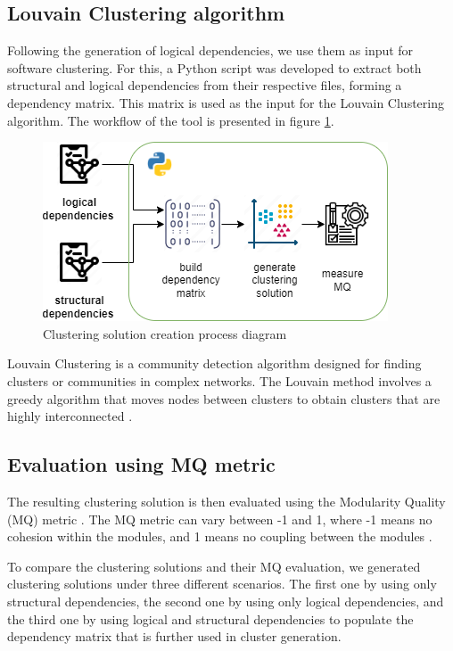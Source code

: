 \documentclass[conference]{IEEEtran}
\begin{document}
\subsection{Louvain Clustering algorithm}

Following the generation of logical dependencies, we use them as input for software clustering. For this, a Python script was developed to extract both structural and logical dependencies from their respective files, forming a dependency matrix. This matrix is used as the input for the Louvain Clustering algorithm. The workflow of the tool is presented in figure \ref{fig:clustering-gen}.

\begin{figure}[H]
\centering
\includegraphics[width=\columnwidth]{clustering-generation.png}
\caption{Clustering solution creation process diagram}
\label{fig:clustering-gen}
\end{figure}

Louvain Clustering is a community detection algorithm designed for finding clusters or communities in complex networks. The Louvain method involves a greedy algorithm that moves nodes between clusters to obtain clusters that are highly interconnected \cite{louvain_clustering}.

\subsection{Evaluation using MQ metric}
The resulting clustering solution is then evaluated using the Modularity Quality (MQ) metric . The MQ metric can vary between -1 and 1, where -1 means no cohesion within the modules, and 1 means no coupling between the modules \cite{mqmetric}.

To compare the clustering solutions and their MQ evaluation, we generated clustering solutions under three different scenarios. The first one by using only structural dependencies, the second one by using only logical dependencies, and the third one by using logical and structural dependencies to populate the dependency matrix that is further used in cluster generation.
\end{document}
